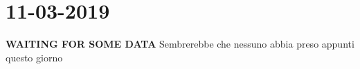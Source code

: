 

\newpage
\section{11-03-2019}
\textbf{WAITING FOR SOME DATA} \newline
Sembrerebbe che nessuno abbia preso appunti questo giorno \newline





